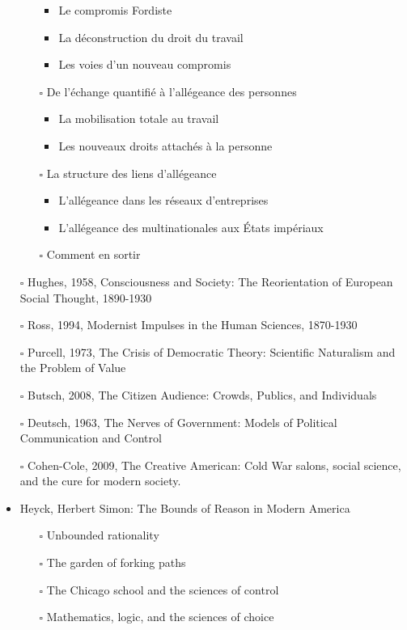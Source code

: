 \documentclass[paper=B6,portrait,twoside=true,twocolumn=false,headinclude=true,footinclude=false,fontsize=12,BCOR=10mm,DIV=calc,pagesize=auto,titlepage=firstiscover,mpinclude=false,headings=normal,headings=twolinechapter,open=right,toc=graduated,chapterprefix=false,numbers=endperiod,parskip=half+]{scrbook}
\theoremstyle{definition}
\begin{document}
\begin{itemize}
\begin{itemize}
\begin{itemize}
\item Le compromis Fordiste
\item La déconstruction du droit du travail
\item Les voies d'un nouveau compromis
\end{itemize}
\item[{$\square$}] De l'échange quantifié à l’allégeance des personnes
\begin{itemize}
\item La mobilisation totale au travail
\item Les nouveaux droits attachés à la personne
\end{itemize}
\item[{$\square$}] La structure des liens d’allégeance
\begin{itemize}
\item L'allégeance dans les réseaux d'entreprises
\item L'allégeance des multinationales aux États impériaux
\end{itemize}
\item[{$\square$}] Comment en sortir
\end{itemize}
\item[{$\square$}] Hughes, 1958, Consciousness and Society: The Reorientation of European Social Thought, 1890-1930
\item[{$\square$}] Ross, 1994, Modernist Impulses in the Human Sciences, 1870-1930
\item[{$\square$}] Purcell, 1973, The Crisis of Democratic Theory: Scientific Naturalism and the Problem of Value
\item[{$\square$}] Butsch, 2008, The Citizen Audience: Crowds, Publics, and Individuals
\item[{$\square$}] Deutsch, 1963, The Nerves of Government: Models of Political Communication and Control
\item[{$\square$}] Cohen-Cole, 2009, The Creative American: Cold War salons, social science, and the cure for modern society.
\item\relax [0/15] Heyck, Herbert Simon: The Bounds of Reason in Modern America
\begin{itemize}
\item[{$\square$}] Unbounded rationality
\item[{$\square$}] The garden of forking paths
\item[{$\square$}] The Chicago school and the sciences of control
\item[{$\square$}] Mathematics, logic, and the sciences of choice

\end{itemize}
\end{itemize}
\end{document}

